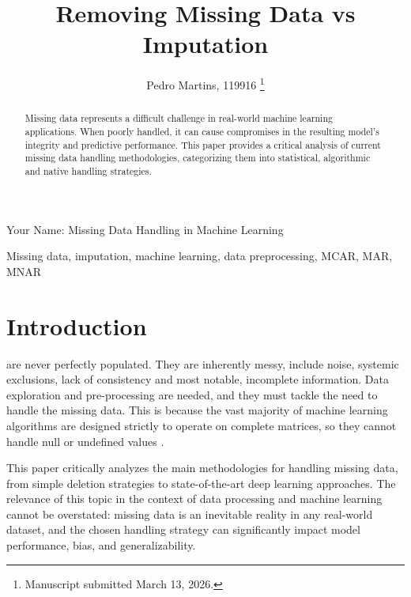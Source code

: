 \documentclass[journal]{IEEEtran}
\begin{document}
\title{Removing Missing Data vs Imputation}

\author{Pedro Martins, 119916
\thanks{Manuscript submitted March 13, 2026.}}

%
{Your Name: Missing Data Handling in Machine Learning}

\maketitle

\begin{abstract}
Missing data represents a difficult challenge in real-world machine learning applications. When poorly handled, it can cause compromises in the resulting model's integrity and predictive performance. This paper provides a critical analysis of current missing data handling methodologies, categorizing them into statistical, algorithmic and native handling strategies.
\end{abstract}

\begin{IEEEkeywords}
Missing data, imputation, machine learning, data preprocessing, MCAR, MAR, MNAR
\end{IEEEkeywords}

\section{Introduction}
 are never perfectly populated. They are inherently messy, include noise, systemic exclusions, lack of consistency and most notable, incomplete information. Data exploration and pre-processing are needed, and they must tackle the need to handle the missing data. This is because the vast majority of machine learning algorithms are designed strictly to operate on complete matrices, so they cannot handle null or undefined values \cite{ahmad2024impact}.

This paper critically analyzes the main methodologies for handling missing data, from simple deletion strategies to state-of-the-art deep learning approaches. The relevance of this topic in the context of data processing and machine learning cannot be overstated: missing data is an inevitable reality in any real-world dataset, and the chosen handling strategy can significantly impact model performance, bias, and generalizability.
\end{document}

